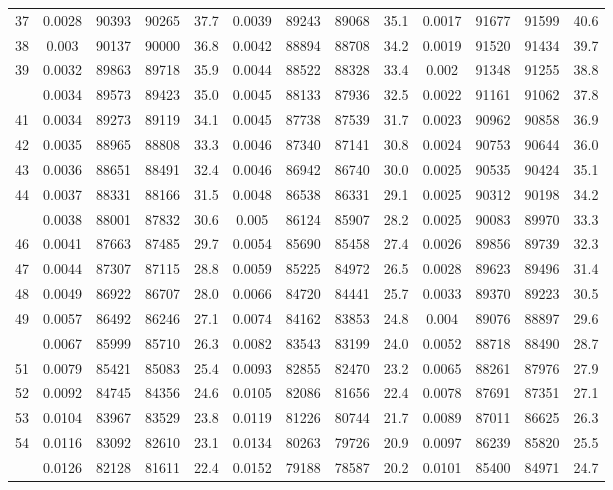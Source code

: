 \documentclass[
  14pt,
]{article}
\begin{document}
\begin{longtable}[t]{lcccccccccccc}
37 & 0.0028 & 90393 & 90265 & 37.7 & 0.0039 & 89243 & 89068 & 35.1 & 0.0017 & 91677 & 91599 & 40.6\\
38 & 0.003 & 90137 & 90000 & 36.8 & 0.0042 & 88894 & 88708 & 34.2 & 0.0019 & 91520 & 91434 & 39.7\\
39 & 0.0032 & 89863 & 89718 & 35.9 & 0.0044 & 88522 & 88328 & 33.4 & 0.002 & 91348 & 91255 & 38.8\\
\addlinespace
40 & 0.0034 & 89573 & 89423 & 35.0 & 0.0045 & 88133 & 87936 & 32.5 & 0.0022 & 91161 & 91062 & 37.8\\
41 & 0.0034 & 89273 & 89119 & 34.1 & 0.0045 & 87738 & 87539 & 31.7 & 0.0023 & 90962 & 90858 & 36.9\\
42 & 0.0035 & 88965 & 88808 & 33.3 & 0.0046 & 87340 & 87141 & 30.8 & 0.0024 & 90753 & 90644 & 36.0\\
43 & 0.0036 & 88651 & 88491 & 32.4 & 0.0046 & 86942 & 86740 & 30.0 & 0.0025 & 90535 & 90424 & 35.1\\
44 & 0.0037 & 88331 & 88166 & 31.5 & 0.0048 & 86538 & 86331 & 29.1 & 0.0025 & 90312 & 90198 & 34.2\\
\addlinespace
45 & 0.0038 & 88001 & 87832 & 30.6 & 0.005 & 86124 & 85907 & 28.2 & 0.0025 & 90083 & 89970 & 33.3\\
46 & 0.0041 & 87663 & 87485 & 29.7 & 0.0054 & 85690 & 85458 & 27.4 & 0.0026 & 89856 & 89739 & 32.3\\
47 & 0.0044 & 87307 & 87115 & 28.8 & 0.0059 & 85225 & 84972 & 26.5 & 0.0028 & 89623 & 89496 & 31.4\\
48 & 0.0049 & 86922 & 86707 & 28.0 & 0.0066 & 84720 & 84441 & 25.7 & 0.0033 & 89370 & 89223 & 30.5\\
49 & 0.0057 & 86492 & 86246 & 27.1 & 0.0074 & 84162 & 83853 & 24.8 & 0.004 & 89076 & 88897 & 29.6\\
\addlinespace
50 & 0.0067 & 85999 & 85710 & 26.3 & 0.0082 & 83543 & 83199 & 24.0 & 0.0052 & 88718 & 88490 & 28.7\\
51 & 0.0079 & 85421 & 85083 & 25.4 & 0.0093 & 82855 & 82470 & 23.2 & 0.0065 & 88261 & 87976 & 27.9\\
52 & 0.0092 & 84745 & 84356 & 24.6 & 0.0105 & 82086 & 81656 & 22.4 & 0.0078 & 87691 & 87351 & 27.1\\
53 & 0.0104 & 83967 & 83529 & 23.8 & 0.0119 & 81226 & 80744 & 21.7 & 0.0089 & 87011 & 86625 & 26.3\\
54 & 0.0116 & 83092 & 82610 & 23.1 & 0.0134 & 80263 & 79726 & 20.9 & 0.0097 & 86239 & 85820 & 25.5\\
\addlinespace
55 & 0.0126 & 82128 & 81611 & 22.4 & 0.0152 & 79188 & 78587 & 20.2 & 0.0101 & 85400 & 84971 & 24.7\\

\end{longtable}
\end{document}
